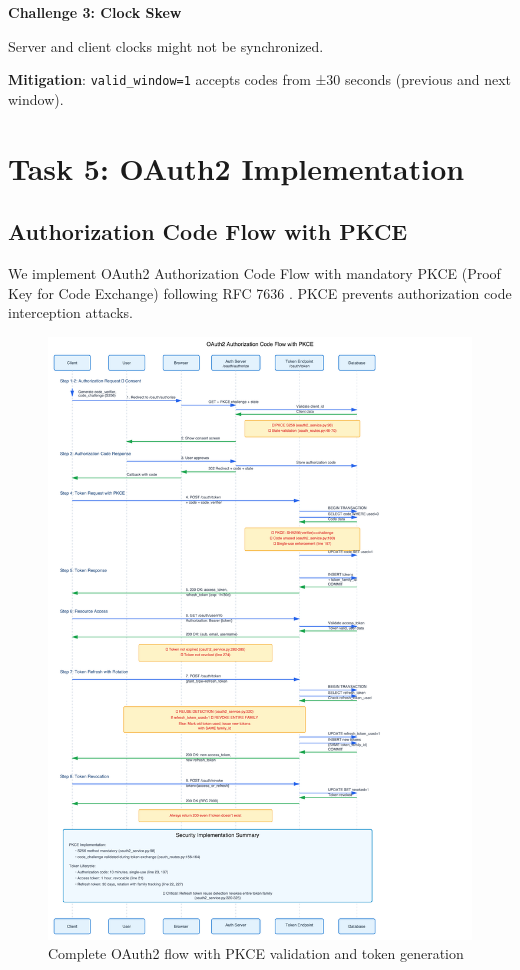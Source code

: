 \documentclass[12pt,a4paper]{article}
\begin{document}
\textbf{Challenge 3: Clock Skew}

Server and client clocks might not be synchronized.

\textbf{Mitigation}: \texttt{valid\_window=1} accepts codes from ±30 seconds (previous and next window).

\section{Task 5: OAuth2 Implementation}

\subsection{Authorization Code Flow with PKCE}

We implement OAuth2 Authorization Code Flow with mandatory PKCE (Proof Key for Code Exchange) following RFC 7636 \cite{sakimura2015}. PKCE prevents authorization code interception attacks.

\begin{landscape}
\begin{figure}[H]
    \centering
    \includegraphics[width=\linewidth,height=0.85\textheight,keepaspectratio]{diagrams/3_oauth2_sequence.png}
    \caption{Complete OAuth2 flow with PKCE validation and token generation}
    \label{fig:oauth2}
\end{figure}
\end{landscape}
\end{document}
